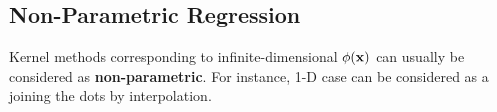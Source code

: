 \subsection{Non-Parametric Regression}
Kernel methods corresponding to infinite-dimensional $\phi({\mathbf{x}})$ can usually be considered as \textbf{non-parametric}.
For instance, 1-D case can be considered as a joining the dots by interpolation. 















